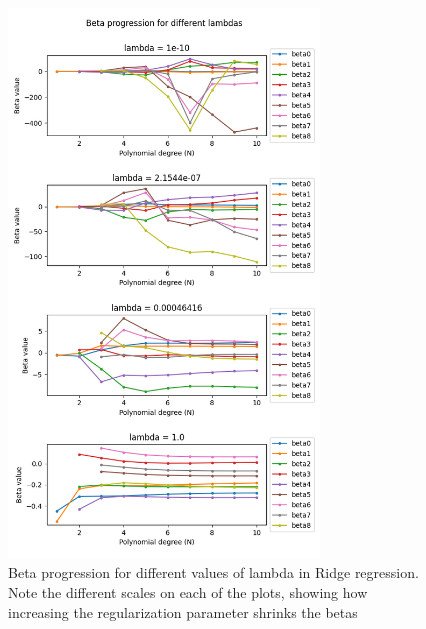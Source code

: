 \documentclass[twocolumn,10pt,cleanfoot]{asme2ej}
\begin{document}
\begin{figure} 
\centerline{\includegraphics[width=3.25in]{figure/frankeridgebetas.png}}
\caption{Beta progression for different values of lambda in Ridge regression. Note the different scales on each of the plots, showing how increasing the regularization parameter shrinks the betas}
\label{frankeridgebetas}
\end{figure}
\end{document}
